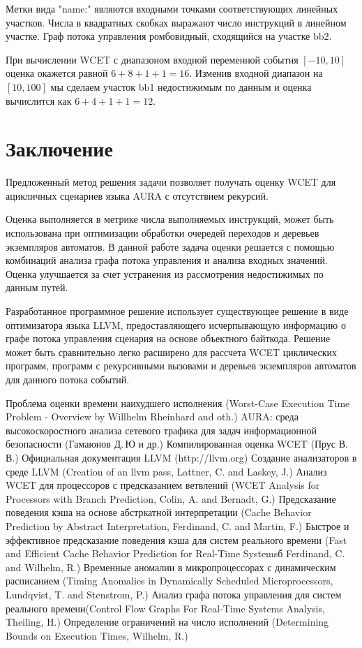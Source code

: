 \documentclass[12pt,a4paper]{article}
\begin{document}
Метки вида "name:" являются входными точками соответствующих линейных участков. Числа в квадратных скобках выражают число инструкций в линейном участке. Граф потока управления ромбовидный, сходящийся на участке bb2.

При вычислении WCET с диапазоном входной переменной события $[-10,10]$ оценка окажется равной $6+8+1+1 = 16$. Изменив входной диапазон на $[10,100]$ мы сделаем участок bb1 недостижимым по данным и оценка вычислится как $6+4+1+1 = 12$.


\newpage
\section{Заключение}
Предложенный метод решения задачи позволяет получать оценку WCET для ацикличных сценариев языка AURA с отсутствием рекурсий.

Оценка выполняется в метрике числа выполняемых инструкций, может быть использована при оптимизации обработки очередей переходов и деревьев экземпляров автоматов. В данной работе задача оценки решается с помощью комбинаций анализа графа потока управления и анализа входных значений. Оценка улучшается за счет устранения из рассмотрения недостижимых по данным путей.

Разработанное программное решение использует существующее решение в виде оптимизатора языка LLVM, предоставляющего исчерпывающую информацию о графе потока управления сценария на основе объектного байткода. Решение может быть сравнительно легко расширено для рассчета WCET циклических программ, программ с рекурсивными вызовами и деревьев экземпляров автоматов для данного потока событий.

\newpage
\begin{thebibliography}{99}
Проблема оценки времени наихудшего исполнения (Worst-Case Execution Time Problem - Overview by Willhelm Rheinhard and oth.)
AURA: среда высокоскоростного анализа сетевого трафика для задач информационной безопасности (Гамаюнов Д.\,Ю и др.)
Компилированная оценка WCET (Прус В.\,В.)
Официальная документация LLVM (http://llvm.org)
Создание анализаторов в среде LLVM (Creation of an llvm pass, Lattner, C. and Laskey, J.)
Анализ WCET для процессоров с предсказанием ветвлений (WCET Analysis for Processors with Branch Prediction, Colin, A. and Bernadt, G.)
Предсказание поведения кэша на основе абстркатной интерпретации (Cache Behavior Prediction by Abstract Interpretation, Ferdinand, C. and Martin, F.)
Быстрое и эффективное предсказание поведения кэша для систем реального времени (Fast and Efficient Cache Behavior Prediction for Real-Time Systemsб Ferdinand, C. and Wilhelm, R.)
Временные аномалии в микропроцессорах с динамическим расписанием (Timing Anomalies in Dynamically Scheduled Microprocessors, Lundqvist, T. and Stenstrom, P.)
Анализ графа потока управления для систем реального времени(Control Flow Graphs For Real-Time Systems Analysis, Theiling, H.)
Определение ограничений на число исполнений (Determining Bounds on Execution Times, Wilhelm, R.)

\end{thebibliography}
\end{document}
